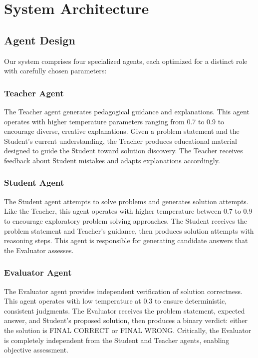 \documentclass[conference]{IEEEtran}
\begin{document}
\section{System Architecture}

\subsection{Agent Design}

Our system comprises four specialized agents, each optimized for a distinct role with carefully chosen parameters:

\subsubsection{Teacher Agent}
The Teacher agent generates pedagogical guidance and explanations. This agent operates with higher temperature parameters ranging from 0.7 to 0.9 to encourage diverse, creative explanations. Given a problem statement and the Student's current understanding, the Teacher produces educational material designed to guide the Student toward solution discovery. The Teacher receives feedback about Student mistakes and adapts explanations accordingly.

\subsubsection{Student Agent}
The Student agent attempts to solve problems and generates solution attempts. Like the Teacher, this agent operates with higher temperature between 0.7 to 0.9 to encourage exploratory problem solving approaches. The Student receives the problem statement and Teacher's guidance, then produces solution attempts with reasoning steps. This agent is responsible for generating candidate answers that the Evaluator assesses.

\subsubsection{Evaluator Agent}
The Evaluator agent provides independent verification of solution correctness. This agent operates with low temperature at 0.3 to ensure deterministic, consistent judgments. The Evaluator receives the problem statement, expected answer, and Student's proposed solution, then produces a binary verdict: either the solution is FINAL CORRECT or FINAL WRONG. Critically, the Evaluator is completely independent from the Student and Teacher agents, enabling objective assessment.
\end{document}
